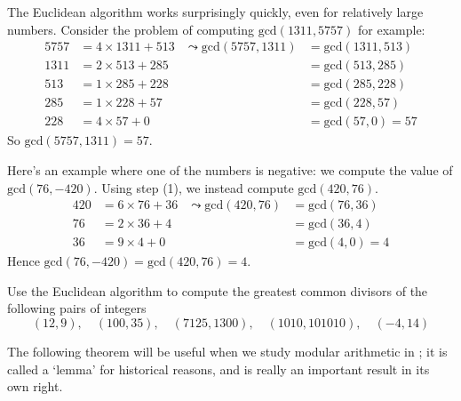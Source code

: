 \begin{example} \label{exGCD13115757}
The Euclidean algorithm works surprisingly quickly, even for relatively large numbers. Consider the problem of computing $\mathrm{gcd}(1311, 5757)$ for example:
\begin{align*}
5757 &= 4 \times 1311 + 513 &\leadsto \mathrm{gcd}(5757,1311) &= \mathrm{gcd}(1311,513)  \\
1311 &= 2 \times 513 + 285 &&= \mathrm{gcd}(513,285) \\
513 &= 1 \times 285 + 228 &&= \mathrm{gcd}(285,228) \\
285 &= 1 \times 228 + 57 &&= \mathrm{gcd}(228, 57) \\
228 &= 4 \times 57 + 0 &&= \mathrm{gcd}(57,0) = 57
\end{align*}
So $\mathrm{gcd}(5757,1311) = 57$.
\end{example}

\begin{example}
Here's an example where one of the numbers is negative: we compute the value of $\mathrm{gcd}(76, -420)$. Using step (1), we instead compute $\mathrm{gcd}(420, 76)$.
\begin{align*}
420 &= 6 \times 76 + 36 &\leadsto \mathrm{gcd}(420,76) &= \mathrm{gcd}(76,36) \\
76 &= 2 \times 36 + 4 &&= \mathrm{gcd}(36,4) \\
36 &= 9 \times 4 + 0 &&= \mathrm{gcd}(4,0) = 4
\end{align*}
Hence $\mathrm{gcd}(76, -420) = \mathrm{gcd}(420,76) = 4$.
\end{example}

\begin{example}
\label{exGCDsofPairs}
Use the Euclidean algorithm to compute the greatest common divisors of the following pairs of integers
\[ (12, 9), \quad (100, 35), \quad (7125, 1300), \quad (1010, 101010), \quad (-4, 14) \]
\end{example}

The following theorem will be useful when we study modular arithmetic in ; it is called a `lemma' for historical reasons, and is really an important result in its own right.

